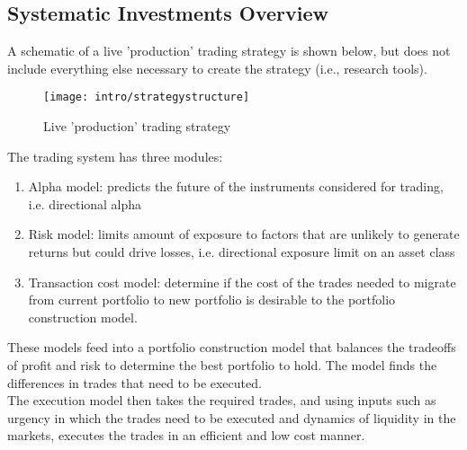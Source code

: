 \subsection{Systematic Investments Overview}

A schematic of a live 'production' trading strategy is shown below, but does not include everything else necessary to create the strategy (i.e., research tools).
\begin{figure}[H]
\centering
\texttt{[image: intro/strategystructure]}
\caption{Live 'production' trading strategy}
\end{figure}
The trading system has three modules:
\begin{enumerate}[label=\roman*.]
\setlength{\itemsep}{0pt}
\item Alpha model: predicts the future of the instruments considered for trading, i.e. directional alpha
\item Risk model: limits amount of exposure to factors that are unlikely to generate returns but could drive losses, i.e. directional exposure limit on an asset class
\item Transaction cost model: determine if the cost of the trades needed to migrate from current portfolio to new portfolio is desirable to the portfolio construction model.
\end{enumerate}
These models feed into a portfolio construction model that balances the tradeoffs of profit and risk to determine the best portfolio to hold. The model finds the differences in trades that need to be executed.\\
The execution model then takes the required trades, and using inputs such as urgency in which the trades need to be executed and dynamics of liquidity in the markets, executes the trades in an efficient and low cost manner.\\

